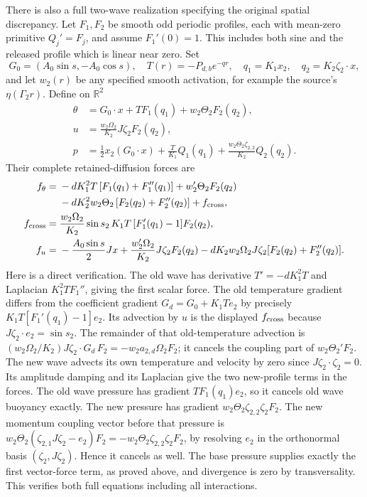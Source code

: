 There is also a full two-wave realization specifying the original
spatial discrepancy. Let $F_1,F_2$ be smooth odd periodic profiles,
each with mean-zero primitive $Q_j'=F_j$, and assume $F_1'(0)=1$.
This includes both sine and the released profile which is linear
near zero. Set
\[
 G_0=(A_0\sin s,-A_0\cos s),\quad
 T(r)=-P_{d,b}e^{-qr},\quad
 q_1=K_1x_2,\quad q_2=K_2\zeta_2\cdot x,
\]
and let $w_2(r)$ be any specified smooth activation, for example
the source's $\eta(\Gamma_2r)$. Define on $\mathbb R^2$
\begin{align}
 \theta&=G_0\cdot x+T F_1(q_1)+w_2\Theta_2F_2(q_2),\nonumber\\
 u&=\frac{w_2\Omega_2}{K_2}J\zeta_2F_2(q_2),\nonumber\\
 p&=\frac12x_2(G_0\cdot x)+\frac{T}{K_1}Q_1(q_1)
          +\frac{w_2\Theta_2\zeta_{2,2}}{K_2}Q_2(q_2).
 \label{eq:cv-feedback-spatial-state}
\end{align}
Their complete retained-diffusion forces are
\begin{align}
 f_\theta={}&-dK_1^2T\,[F_1(q_1)+F_1''(q_1)]
 +w_2'\Theta_2F_2(q_2)\nonumber\\
 &-dK_2^2w_2\Theta_2\,[F_2(q_2)+F_2''(q_2)]
 +f_{\rm cross},\label{eq:cv-feedback-spatial-scalar-force}\\
 f_{\rm cross}={}&\frac{w_2\Omega_2}{K_2}\sin s_2\,
        K_1T\,[F_1'(q_1)-1]F_2(q_2),
 \label{eq:cv-feedback-exact-cross-force}\\
 f_u={}&-\frac{A_0\sin s}2Jx
 +\frac{w_2'\Omega_2}{K_2}J\zeta_2F_2(q_2)
 -dK_2w_2\Omega_2J\zeta_2[F_2(q_2)+F_2''(q_2)].
 \label{eq:cv-feedback-spatial-momentum-force}
\end{align}
Here is a direct verification. The old wave has derivative $T'=-dK_1^2T$
and Laplacian $K_1^2TF_1''$, giving the first scalar force.
The old temperature gradient differs from the coefficient gradient
$G_d=G_0+K_1Te_2$ by precisely
$K_1T[F_1'(q_1)-1]e_2$. Its advection by $u$ is the displayed
$f_{\rm cross}$ because $J\zeta_2\cdot e_2=\sin s_2$.
The remainder of that old-temperature advection is
$(w_2\Omega_2/K_2)J\zeta_2\cdot G_d\,F_2=-w_2a_{2,d}\Omega_2F_2$;
it cancels the coupling part of $w_2\Theta_2'F_2$.
The new wave advects its own temperature and velocity by zero since
$J\zeta_2\cdot\zeta_2=0$. Its amplitude damping and its Laplacian
give the two new-profile terms in the forces.
The old wave pressure has gradient $TF_1(q_1)e_2$, so it cancels
old wave buoyancy exactly. The new pressure has gradient
$w_2\Theta_2\zeta_{2,2}\zeta_2F_2$.
The new momentum coupling vector before that pressure is
$w_2\Theta_2(\zeta_{2,1}J\zeta_2-e_2)F_2
=-w_2\Theta_2\zeta_{2,2}\zeta_2F_2$, by resolving $e_2$ in the
orthonormal basis $(\zeta_2,J\zeta_2)$. Hence it cancels as well.
The base pressure supplies exactly the first vector-force term,
as proved above, and divergence is zero by transversality.
This verifies both full equations including all interactions.

